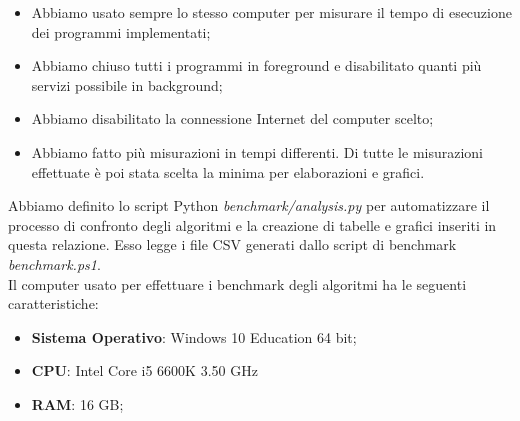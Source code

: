 \begin{itemize}
    \item Abbiamo usato sempre lo stesso computer per misurare il tempo di esecuzione dei programmi implementati;
    \item Abbiamo chiuso tutti i programmi in foreground e disabilitato quanti più servizi possibile in background;
    \item Abbiamo disabilitato la connessione Internet del computer scelto;
    \item Abbiamo fatto più misurazioni in tempi differenti. Di tutte le misurazioni effettuate è poi stata scelta la minima per elaborazioni e grafici.
\end{itemize}

\noindent Abbiamo definito lo script Python \textit{benchmark/analysis.py} per automatizzare il processo di confronto degli algoritmi e la creazione di tabelle e grafici inseriti in questa relazione. Esso legge i file CSV generati dallo script di benchmark \textit{benchmark.ps1}. \\

\noindent Il computer usato per effettuare i benchmark degli algoritmi ha le seguenti caratteristiche:

\begin{itemize}
    \item \textbf{Sistema Operativo}: Windows 10 Education 64 bit;
    \item \textbf{CPU}: Intel Core i5 6600K 3.50 GHz
    \item \textbf{RAM}: 16 GB;
\end{itemize}
